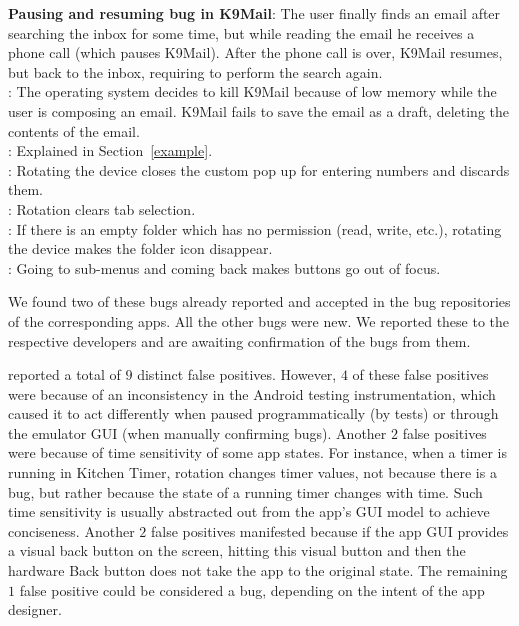 {\bf Pausing and resuming bug in K9Mail}: The user finally finds an
email after searching the inbox for some time, but while reading the
email he receives a phone call (which pauses K9Mail). After the phone
call is over, K9Mail resumes, but back to the inbox, requiring to perform the
search again.
\\
: The operating system decides to kill K9Mail because of low memory while the user is composing an email. K9Mail fails to save the email as a draft, deleting the contents of the email.
\\
: Explained in Section~\ref{example}.
\\
: Rotating the device closes the custom pop up for entering numbers and discards them.
\\
: Rotation clears tab selection. 
\\
: If there is an empty folder which has no permission (read, write, etc.), rotating the device makes the folder icon disappear.
\\
: Going to sub-menus and coming back makes buttons go out of focus.

We found two of these bugs already reported and accepted in the bug repositories of the corresponding apps. All the other bugs were new.
We reported these to the respective developers and are awaiting confirmation of the bugs from them. 

\tool{} reported a total of $9$ distinct false positives. However, $4$ of these false positives were because of an inconsistency in the Android testing instrumentation, which caused it to act differently when paused programmatically (by tests) or through the emulator GUI (when manually confirming bugs). Another $2$ false positives were because of time sensitivity of some app states. For instance, when a timer is running in Kitchen Timer, rotation changes timer values, not because there is a bug, but rather because the state of a running timer changes with time. Such time sensitivity is usually abstracted out from the app's GUI model to achieve conciseness. Another $2$ false positives manifested because if the app GUI provides a visual back button on the screen, hitting this visual button and then the hardware Back button does not take the app to the original state. The remaining $1$ false positive could be considered a bug, depending on the intent of the app designer.

